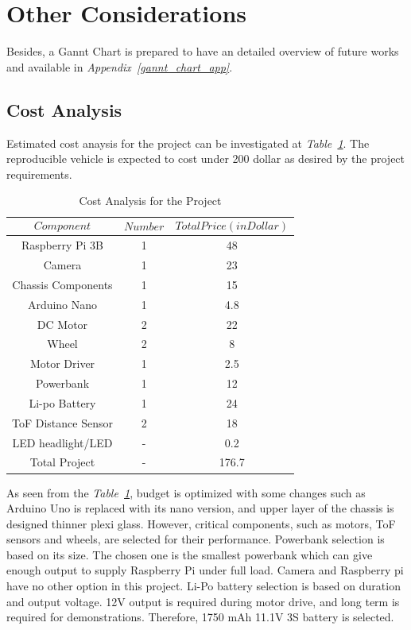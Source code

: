 \documentclass[a4paper,12pt]{article}
\begin{document}
	
	
	
	
	
	\section{Other Considerations}

Besides, a Gannt Chart is prepared to have an detailed overview of future works and available in \textit{Appendix~\ref{gannt_chart_app}}.
	
	
	
	
	\subsection{Cost Analysis}
		Estimated cost anaysis for the project can be investigated at \textit{Table~\ref{tab:cost}}. The reproducible vehicle is expected to cost under 200 dollar as desired by the project requirements.
	
	\begin{table}[H]
  \centering
 	
 	\caption{Cost Analysis for the Project}
    \begin{tabular}{c|c|c}
       $$Component$$ & $$Number$$ & $$Total Price (in Dollar)$$  \\ \hline
       Raspberry Pi 3B & 1 & 48   \\ \hline
       Camera & 1 & 23   \\ \hline
       Chassis Components & 1 & 15   \\ \hline
       Arduino Nano & 1 &  4.8 \\ \hline
       DC Motor & 2 & 22 \\ \hline
       Wheel & 2 & 8 \\ \hline
       Motor Driver & 1 &  2.5 \\ \hline
       Powerbank & 1 & 12 \\ \hline
       Li-po Battery  & 1 & 24 \\ \hline
       ToF Distance Sensor & 2 & 18 \\ \hline
       LED headlight/LED & - & 0.2 \\ \hline
       Total Project & - & 176.7 
         
  
  \end{tabular} 
  \label{tab:cost}
    
\end{table}

	As seen from the \textit{Table~\ref{tab:cost}}, budget is optimized with some changes such as Arduino Uno is replaced with its nano version, and upper layer of the chassis is designed thinner plexi glass. However, critical components, such as motors, ToF sensors and wheels, are selected for their performance. Powerbank selection is based on its size. The chosen one is the smallest powerbank which can give enough output to supply Raspberry Pi under full load. Camera and Raspberry pi have no other option in this project. Li-Po battery selection is based on duration and output voltage. 12V output is required during motor drive, and long term is required for demonstrations. Therefore, 1750 mAh 11.1V 3S battery is selected. 
  
\end{document}
